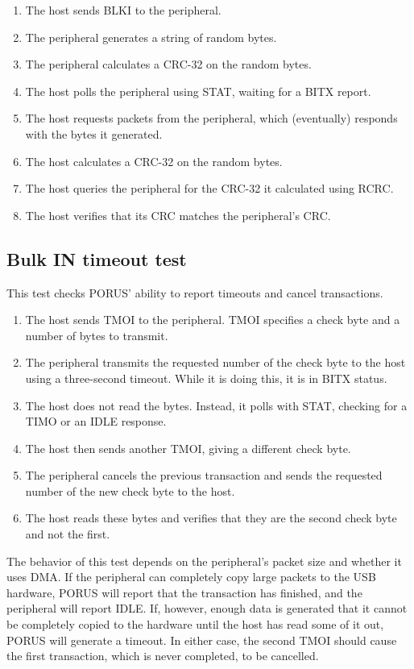 \documentclass[a4paper]{book}
\begin{document}
\begin{enumerate}
\item The host sends BLKI to the peripheral.
\item The peripheral generates a string of random bytes.
\item The peripheral calculates a CRC-32 on the random bytes.
\item The host polls the peripheral using STAT, waiting for a BITX report.
\item The host requests packets from the peripheral, which (eventually) responds with the bytes it generated.
\item The host calculates a CRC-32 on the random bytes.
\item The host queries the peripheral for the CRC-32 it calculated using RCRC.
\item The host verifies that its CRC matches the peripheral's CRC.
\end{enumerate}

\subsection{Bulk IN timeout test}
\label{sec_bulkinerrortest}

This test checks PORUS' ability to report timeouts and cancel transactions.

\begin{enumerate}
\item The host sends TMOI to the peripheral.  TMOI specifies a check byte and a number of bytes to transmit.
\item The peripheral transmits the requested number of the check byte to the host using a three-second timeout.  While it is doing this, it is in BITX status.
\item The host does not read the bytes.  Instead, it polls with STAT, checking for a TIMO or an IDLE response.
\item The host then sends another TMOI, giving a different check byte.
\item The peripheral cancels the previous transaction and sends the requested number of the new check byte to the host.
\item The host reads these bytes and verifies that they are the second check byte and not the first.
\end{enumerate}

The behavior of this test depends on the peripheral's packet size and whether it uses DMA.  If the peripheral can completely copy large packets to the USB hardware, PORUS will report that the transaction has finished, and the peripheral will report IDLE.  If, however, enough data is generated that it cannot be completely copied to the hardware until the host has read some of it out, PORUS will generate a timeout.  In either case, the second TMOI should cause the first transaction, which is never completed, to be cancelled.
\end{document}
